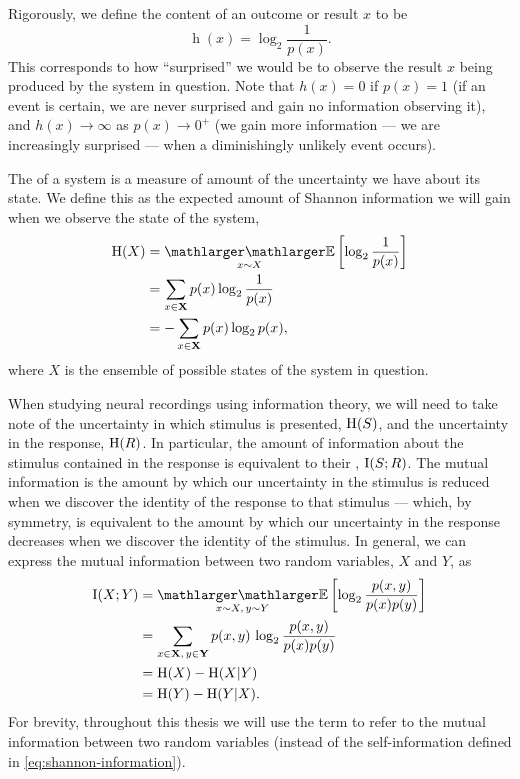Rigorously, we define the  content of an outcome or result $x$ to be
\begin{equation}
\label{eq:shannon-information}
\operatorname{h}(x) = \log_2 \frac{1}{p(x)}
.\end{equation}
This corresponds to how ``surprised'' we would be to observe the result $x$ being produced by the system in question.
Note that $h(x)=0$ if $p(x)=1$ (if an event is certain, we are never surprised and gain no information observing it), and $h(x) \to \infty$ as $p(x) \to 0^+$ (we gain more information --- we are increasingly surprised --- when a diminishingly unlikely event occurs).

The  of a system is a measure of amount of the uncertainty we have about its state.
We define this as the expected amount of Shannon information we will gain when we observe the state of the system,
\begin{align}
\HH( X )
  &= \EE_{x\sim X} \left[ \log_2 \frac{1}{p(x)} \right] \notag
\\&= \sum_{x \in \SET{X}} p(x) \log_2 \frac{1}{p(x)} \notag
\\&= - \sum_{x \in \SET{X}} p(x) \log_2 p(x)
,\end{align}
where $X$ is the ensemble of possible states of the system in question.

When studying neural recordings using information theory, we will need to take note of the uncertainty in which stimulus is presented, $\operatorname{H}(S)$, and the uncertainty in the response, $\operatorname{H}(R)$.
In particular, the amount of information about the stimulus contained in the response is equivalent to their , $\operatorname{I}(S;R)$.
The mutual information is the amount by which our uncertainty in the stimulus is reduced when we discover the identity of the response to that stimulus --- which, by symmetry, is equivalent to the amount by which our uncertainty in the response decreases when we discover the identity of the stimulus.
In general, we can express the mutual information between two random variables, $X$ and $Y$, as
\begin{align}
\I(X;Y)
  &= \EE_{x\sim X, \, y\sim Y} \left[ \log_2 \frac{p(x,y)}{p(x)p(y)} \right] \notag
\\&= \sum_{x \in \SET{X}, \, y \in \SET{Y}} p(x,y) \, \log_2 \frac{p(x,y)}{p(x)p(y)} \notag
\\&= \HH(X) - \HH(X | Y) \notag
\\&= \HH(Y) - \HH(Y | X) \label{eq:info}
.\end{align}
For brevity, throughout this thesis we will use the term  to refer to the mutual information between two random variables (instead of the self-information defined in \autoref{eq:shannon-information}).

